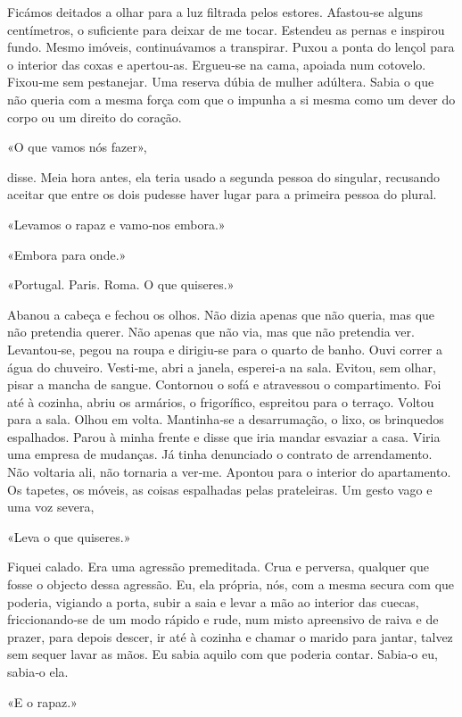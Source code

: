 Ficámos deitados a olhar para a luz filtrada pelos estores. Afastou­‑se
alguns centímetros, o suficiente para deixar de me tocar. Estendeu as
pernas e inspirou fundo. Mesmo imóveis, continuávamos a transpirar.
Puxou a ponta do lençol para o interior das coxas e apertou­‑as.
Ergueu­‑se na cama, apoiada num cotovelo. Fixou­‑me sem pestanejar. Uma
reserva dúbia de mulher adúltera. Sabia o que não queria com a mesma
força com que o impunha a si mesma como um dever do corpo ou um direito
do coração.

«O que vamos nós fazer»,

disse. Meia hora antes, ela teria usado a segunda pessoa do singular,
recusando aceitar que entre os dois pudesse haver lugar para a primeira
pessoa do plural.

«Levamos o rapaz e vamo­‑nos embora.»

«Embora para onde.»

«Portugal. Paris. Roma. O que quiseres.»

Abanou a cabeça e fechou os olhos. Não dizia apenas que não queria, mas
que não pretendia querer. Não apenas que não via, mas que não pretendia
ver. Levantou­‑se, pegou na roupa e dirigiu­‑se para o quarto de banho.
Ouvi correr a água do chuveiro. Vesti­‑me, abri a janela, esperei­‑a na
sala. Evitou, sem olhar, pisar a mancha de sangue. Contornou o sofá e
atravessou o compartimento. Foi até à cozinha, abriu os armários, o
frigorífico, espreitou para o terraço. Voltou para a sala. Olhou em
volta. Mantinha­‑se a desarrumação, o lixo, os brinquedos espalhados.
Parou à minha frente e disse que iria mandar esvaziar a casa. Viria uma
empresa de mudanças. Já tinha denunciado o contrato de arrendamento. Não
voltaria ali, não tornaria a ver­‑me. Apontou para o interior do
apartamento. Os tapetes, os móveis, as coisas espalhadas pelas
prateleiras. Um gesto vago e uma voz severa,

«Leva o que quiseres.»

Fiquei calado. Era uma agressão premeditada. Crua e perversa, qualquer
que fosse o objecto dessa agressão. Eu, ela própria, nós, com a mesma
secura com que poderia, vigiando a porta, subir a saia e levar a mão ao
interior das cuecas, friccionando­‑se de um modo rápido e rude, num
misto apreensivo de raiva e de prazer, para depois descer, ir até à
cozinha e chamar o marido para jantar, talvez sem sequer lavar as mãos.
Eu sabia aquilo com que poderia contar. Sabia­‑o eu, sabia­‑o ela.

«E o rapaz.»

